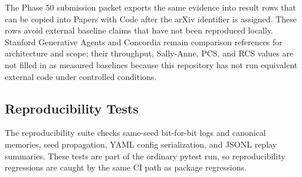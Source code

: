 The Phase 50 submission packet exports the same evidence into result rows that can be copied into Papers with Code after the arXiv identifier is assigned. These rows avoid external baseline claims that have not been reproduced locally. Stanford Generative Agents and Concordia remain comparison references for architecture and scope; their throughput, Sally-Anne, PCS, and RCS values are not filled in as measured baselines because this repository has not run equivalent external code under controlled conditions.



\subsection{Reproducibility Tests}

The reproducibility suite checks same-seed bit-for-bit logs and canonical memories, seed propagation, YAML config serialization, and JSONL replay summaries. These tests are part of the ordinary pytest run, so reproducibility regressions are caught by the same CI path as package regressions.




